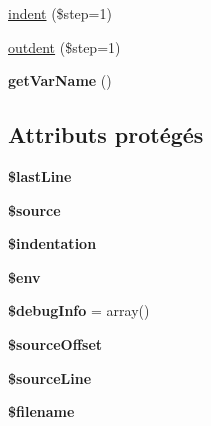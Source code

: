 \begin{DoxyCompactItemize}
\item 
\hyperlink{class_twig___compiler_ae38e0e6d69bdddcc75a75896d5370167}{indent} (\$step=1)
\item 
\hyperlink{class_twig___compiler_ae5c53e68fb6c62e64ac3141b05195efa}{outdent} (\$step=1)
\item 
{\bfseries get\+Var\+Name} ()\hypertarget{class_twig___compiler_a01f345a64ec10225d4205181cf82c811}{}\label{class_twig___compiler_a01f345a64ec10225d4205181cf82c811}

\end{DoxyCompactItemize}
\subsection*{Attributs protégés}
\begin{DoxyCompactItemize}
\item 
{\bfseries \$last\+Line}\hypertarget{class_twig___compiler_ac7c4a58426a915ffdd1d0fc5c7607414}{}\label{class_twig___compiler_ac7c4a58426a915ffdd1d0fc5c7607414}

\item 
{\bfseries \$source}\hypertarget{class_twig___compiler_a99a2b085f0a29bd5d799fdcbb63d261b}{}\label{class_twig___compiler_a99a2b085f0a29bd5d799fdcbb63d261b}

\item 
{\bfseries \$indentation}\hypertarget{class_twig___compiler_aff1f1ea116fe6e27da24f330c01d8718}{}\label{class_twig___compiler_aff1f1ea116fe6e27da24f330c01d8718}

\item 
{\bfseries \$env}\hypertarget{class_twig___compiler_aa99ce9ae015e958eef5782267276fbb4}{}\label{class_twig___compiler_aa99ce9ae015e958eef5782267276fbb4}

\item 
{\bfseries \$debug\+Info} = array()\hypertarget{class_twig___compiler_a601615f391a623af43e3efcffdac222a}{}\label{class_twig___compiler_a601615f391a623af43e3efcffdac222a}

\item 
{\bfseries \$source\+Offset}\hypertarget{class_twig___compiler_a9b0e3f57528b80bcd901acf12393417a}{}\label{class_twig___compiler_a9b0e3f57528b80bcd901acf12393417a}

\item 
{\bfseries \$source\+Line}\hypertarget{class_twig___compiler_ae84c34a122875c7dd130a831dd5ba5fb}{}\label{class_twig___compiler_ae84c34a122875c7dd130a831dd5ba5fb}

\item 
{\bfseries \$filename}\hypertarget{class_twig___compiler_a0722441477f957078ee2437054556cbc}{}\label{class_twig___compiler_a0722441477f957078ee2437054556cbc}

\end{DoxyCompactItemize}


